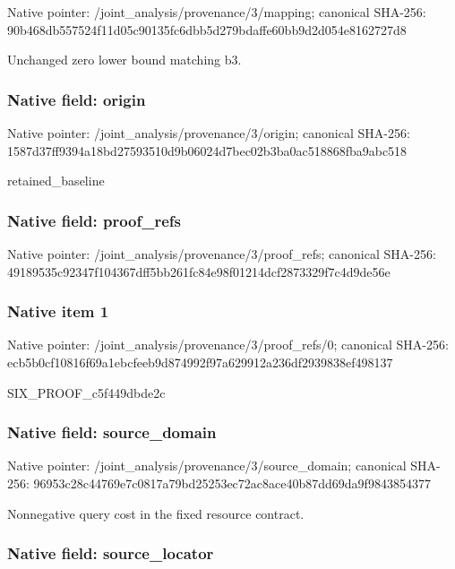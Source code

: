 \documentclass[10pt,a4paper]{article}
\begin{document}
Native pointer: /joint\_analysis/provenance/3/mapping; canonical SHA-256: 90b468db557524f11d05c901\allowbreak{}35fc6dbb5d279bdaffe60bb9\allowbreak{}d2d054e8162727d8


Unchanged zero lower bound matching b3.


\subsubsection{Native field: origin}


Native pointer: /joint\_analysis/provenance/3/origin; canonical SHA-256: 1587d37ff9394a18bd275935\allowbreak{}10d9b06024d7bec02b3ba0ac\allowbreak{}518868fba9abc518


retained\_baseline


\subsubsection{Native field: proof\_refs}


Native pointer: /joint\_analysis/provenance/3/proof\_refs; canonical SHA-256: 49189535c92347f104367dff\allowbreak{}5bb261fc84e98f01214dcf28\allowbreak{}73329f7c4d9de56e



\subsubsection{Native item 1}


Native pointer: /joint\_analysis/provenan\allowbreak{}ce/3/proof\_refs/0; canonical SHA-256: ecb5b0cf10816f69a1ebcfee\allowbreak{}b9d874992f97a629912a236d\allowbreak{}f2939838ef498137


SIX\_PROOF\_c5f449dbde2c


\subsubsection{Native field: source\_domain}


Native pointer: /joint\_analysis/provenan\allowbreak{}ce/3/source\_domain; canonical SHA-256: 96953c28c44769e7c0817a79\allowbreak{}bd25253ec72ac8ace40b87dd\allowbreak{}69da9f9843854377


Nonnegative query cost in the fixed resource contract.


\subsubsection{Native field: source\_locator}
\end{document}
